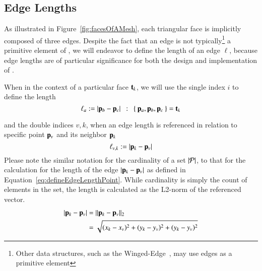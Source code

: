 \subsection{Edge Lengths}
\label{chBsEL}
As illustrated in Figure~\ref{fig:facesOfAMesh}, each triangular face is implicitly composed of three edges. Despite the fact that an edge is not typically\footnote{Other data structures, such as the Winged-Edge~\cite[p.~1]{Baumgart75}, may use edges as a primitive element} a primitive element of \tdd{}, we will endeavor to define the length of an edge $\ell$, because edge lengths are of particular significance for both the design and implementation of .

When in the context of a particular face $\mathbf{t}_k$, we will use the single index $i$ to define the length
\begin{equation}
	\ell_a := |\mathbf{p}_b - \mathbf{p}_c| \enspace:\enspace \left \{\:\mathbf{p}_a, \mathbf{p}_b, \mathbf{p}_c\:\right \} = \mathbf{t}_k
	\label{eq:defineEdgeLengthFace}
\end{equation}%
%
 
and the double indices $v,k$, when an edge length is referenced in relation to specific point $\mathbf{p}_v$ and its neighbor $\mathbf{p}_k$
\begin{equation}
	\ell_{v,k} := |\mathbf{p}_k - \mathbf{p}_v|
	\label{eq:defineEdgeLengthPoint}
\end{equation}%
%
Please note the similar notation for the cardinality of a set $|\mathcal{P}|$, to that for the calculation for the length of the edge $|\mathbf{p}_k - \mathbf{p}_v|$ as defined in Equation~\ref{eq:defineEdgeLengthPoint}. While cardinality is simply the count of elements in the set, the length is calculated as the L2-norm of the referenced vector.~\cite[p.~26]{Mara12}
\begin{equation}
\begin{aligned}
	|\mathbf{p}_k - \mathbf{p}_v| & = \lVert\mathbf{p}_k - \mathbf{p}_v\rVert_2 \\
					& = \sqrt{(x_k-x_v)^2 + (y_k-y_v)^2 + (y_k-y_v)^2}
	\label{eq:defineEdgeLengthCalc}
\end{aligned}
\end{equation}
%
